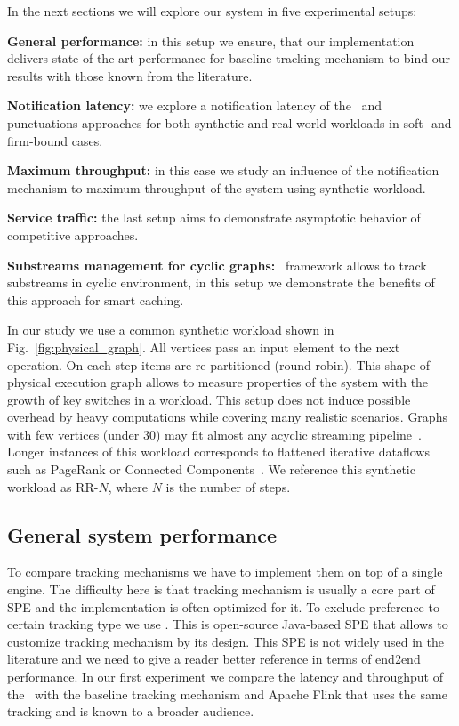 In the next sections we will explore our system in five experimental setups:
    
    \noindent \textbf{General performance:} in this setup we ensure, that our implementation delivers state-of-the-art performance for baseline tracking mechanism to bind our results with those known from the literature.
    
    \noindent \textbf{Notification latency:} we explore a notification latency of the \tracker\ and punctuations approaches for both synthetic and real-world workloads in soft- and firm-bound cases.
    
    \noindent \textbf{Maximum throughput:} in this case we study an influence of the notification mechanism to maximum throughput of the system using synthetic workload.
    
    \noindent \textbf{Service traffic:} the last setup aims to demonstrate asymptotic behavior of competitive approaches.
    
    \noindent \textbf{Substreams management for cyclic graphs:} \tracker\ framework allows to track substreams in cyclic environment, in this setup we demonstrate the benefits of this approach for smart caching.

In our study we use a common synthetic workload shown in Fig.~\ref{fig:physical_graph}. All vertices pass an input element to the next operation. On each step items are re-partitioned (round-robin). This shape of physical execution graph allows to measure properties of the system with the growth of key switches in a workload. This setup does not induce possible overhead by heavy computations while covering many realistic scenarios. Graphs with few vertices (under 30) may fit almost any acyclic streaming pipeline~\cite{akidau2018streaming}. Longer instances of this workload corresponds to flattened iterative dataflows such as PageRank or Connected Components~\cite{Murray:2013:NTD:2517349.2522738, xu2016efficient}. We reference this synthetic workload as RR-$N$, where $N$ is the number of steps.

\subsection{General system performance}
To compare tracking mechanisms we have to implement them on top of a single engine. The difficulty here is that tracking mechanism is usually a core part of SPE and the implementation is often optimized for it. To exclude preference to certain tracking type we use \FlameStream. This is open-source Java-based SPE that allows to customize tracking mechanism by its design. This SPE is not widely used in the literature and we need to give a reader better reference in terms of end2end performance. In our first experiment we compare the latency and throughput of the \FlameStream\ with the baseline tracking mechanism and Apache Flink that uses the same tracking and is known to a broader audience.


